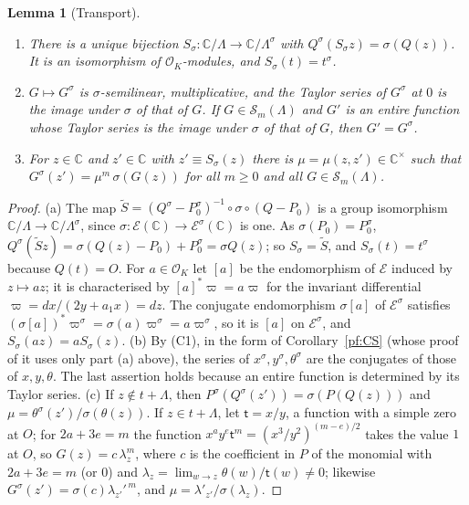 \documentclass[10pt]{amsart}
\newtheorem{lemma}[theorem]{Lemma}
\theoremstyle{definition}
\theoremstyle{remark}
\newcommand{\C}{\mathbb C}
\providecommand{\auO}{\mathcal O}
\begin{document}
\begin{lemma}[Transport]\label{pf:transport}
\begin{enumerate}
\item[(a)] There is a unique bijection $S_\sigma\colon\C/\Lambda\to\C/\Lambda^\sigma$ with
$Q^\sigma(S_\sigma z)=\sigma(Q(z))$. It is an isomorphism of $\auO_K$-modules, and
$S_\sigma(t)=t^\sigma$.
\item[(b)] $G\mapsto G^\sigma$ is $\sigma$-semilinear, multiplicative, and the Taylor series of
$G^\sigma$ at $0$ is the image under $\sigma$ of that of $G$. If $G\in\mathcal S_m(\Lambda)$ and
$G'$ is an entire function whose Taylor series is the image under $\sigma$ of that of $G$, then
$G'=G^\sigma$.
\item[(c)] For $z\in\C$ and $z'\in\C$ with $z'\equiv S_\sigma(z)$ there is $\mu=\mu(z,z')\in
\C^\times$ such that $G^\sigma(z')=\mu^m\,\sigma(G(z))$ for all $m\ge0$ and all $G\in\mathcal S_m
(\Lambda)$.
\end{enumerate}
\end{lemma}
\begin{proof}
(a) The map $\widetilde S=(Q^\sigma-P_0^\sigma)^{-1}\circ\sigma\circ(Q-P_0)$ is a group isomorphism
$\C/\Lambda\to\C/\Lambda^\sigma$, since $\sigma\colon\mathcal E(\C)\to\mathcal E^\sigma(\C)$ is one.
As $\sigma(P_0)=P_0^\sigma$, $Q^\sigma(\widetilde Sz)=\sigma(Q(z)-P_0)+P_0^\sigma=\sigma Q(z)$; so
$S_\sigma=\widetilde S$, and $S_\sigma(t)=t^\sigma$ because $Q(t)=O$. For $a\in\auO_K$ let $[a]$ be
the endomorphism of $\mathcal E$ induced by $z\mapsto az$; it is characterised by $[a]^*\varpi=
a\varpi$ for the invariant differential $\varpi=dx/(2y+a_1x)=dz$. The conjugate endomorphism
$\sigma[a]$ of $\mathcal E^\sigma$ satisfies $(\sigma[a])^*\varpi^\sigma=\sigma(a)\varpi^\sigma=
a\varpi^\sigma$, so it is $[a]$ on $\mathcal E^\sigma$, and $S_\sigma(az)=aS_\sigma(z)$.
(b) By (C1), in the form of Corollary~\ref{pf:CS} (whose proof of it uses only part (a) above), the series of $x^\sigma,y^\sigma,\theta^\sigma$ are the conjugates of those of
$x,y,\theta$. The last assertion holds because an entire function is determined by its Taylor
series. (c) If $z\notin t+\Lambda$, then $P^\sigma(Q^\sigma(z'))=\sigma(P(Q(z)))$ and
$\mu=\theta^\sigma(z')/\sigma(\theta(z))$. If $z\in t+\Lambda$, let $\mathsf t=x/y$, a function
with a simple zero at $O$; for $2a+3e=m$ the function $x^ay^e\mathsf t^m=(x^3/y^2)^{(m-e)/2}$
takes the value $1$ at $O$, so $G(z)=c\,\lambda_z^m$, where $c$ is the coefficient in $P$ of the
monomial with $2a+3e=m$ (or $0$) and $\lambda_z=\lim_{w\to z}\theta(w)/\mathsf t(w)\ne0$; likewise
$G^\sigma(z')=\sigma(c)\lambda_{z'}'^{\,m}$, and $\mu=\lambda'_{z'}/\sigma(\lambda_z)$.
\end{proof}
\end{document}
